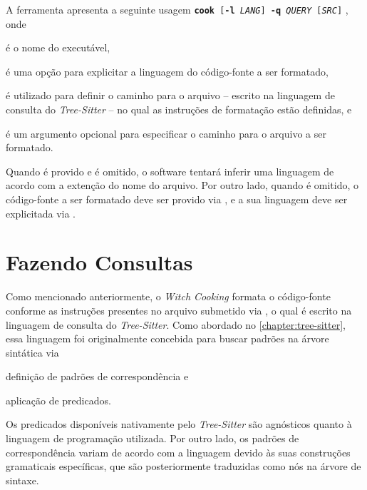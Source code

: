 \documentclass
 [11pt,a4paper,english,brazil,openright,sumario=tradicional,twoside]
 {abntex2}
\newcommand{\treesitter}{\textit{Tree-Sitter}\xspace}
\newcommand{\witchcooking}{\textit{Witch Cooking}\xspace}
\begin{document}
 A ferramenta apresenta a seguinte usagem
 \boxed
  {\texttt{\textbf{cook}
   [\textbf{-l} \textit{LANG}]
   \textbf{-q} \textit{QUERY}
   [\textit{SRC}]}}%
 , onde
 \begin{inparaenum}
  \item {} é o nome do executável,
  \item {} é uma opção para
        explicitar a linguagem do código-fonte a ser formatado,
  \item {} é utilizado para definir o
        caminho para o arquivo -- escrito na linguagem de consulta do
        \treesitter{} -- no qual as instruções de formatação estão definidas, e
  \item {} é um argumento opcional para
        especificar o caminho para o arquivo a ser formatado.
 \end{inparaenum}
 Quando  é provido e
  é omitido, o software tentará
 inferir uma linguagem de acordo com a extenção do nome do arquivo. Por outro
 lado, quando  é omitido, o código-fonte a ser
 formatado deve ser provido via \textit{}, e a sua linguagem
 deve ser explicitada via .

 \section{Fazendo Consultas}

 Como mencionado anteriormente, o \witchcooking formata o código-fonte conforme
 as instruções presentes no arquivo submetido via
 , o qual é escrito na linguagem de
 consulta do \treesitter. Como abordado no \autoref{chapter:tree-sitter}, essa
 linguagem foi originalmente concebida para buscar padrões na árvore sintática
 via
 \begin{inparaenum}
  \item definição de padrões de correspondência e
  \item aplicação de predicados.
 \end{inparaenum}
 Os predicados disponíveis nativamente pelo \treesitter são agnósticos quanto à
 linguagem de programação utilizada. Por outro lado, os padrões de
 correspondência variam de acordo com a linguagem devido às suas construções
 gramaticais específicas, que são posteriormente traduzidas como nós na árvore
 de sintaxe.
\end{document}
